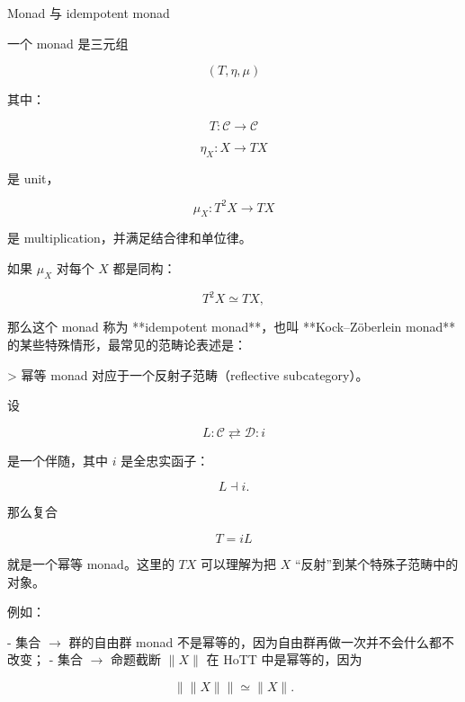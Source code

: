 \documentclass{beamer}
\begin{document}
\begin{frame}{Monad 与 idempotent monad}
\begin{markdown}
一个 monad 是三元组

$$
(T,\eta,\mu)
$$

其中：

$$
T:\mathcal C\to\mathcal C
$$

$$
\eta_X:X\to TX
$$

是 unit，

$$
\mu_X:T^2X\to TX
$$

是 multiplication，并满足结合律和单位律。

如果 $\mu_X$ 对每个 $X$ 都是同构：

$$
T^2X \simeq TX,
$$

那么这个 monad 称为 **idempotent monad**，也叫 **Kock–Zöberlein monad** 的某些特殊情形，最常见的范畴论表述是：

> 幂等 monad 对应于一个反射子范畴（reflective subcategory）。

设

$$
L:\mathcal C\rightleftarrows \mathcal D:i
$$

是一个伴随，其中 $i$ 是全忠实函子：

$$
L\dashv i.
$$

那么复合

$$
T=iL
$$

就是一个幂等 monad。这里的 $TX$ 可以理解为把 $X$ “反射”到某个特殊子范畴中的对象。

例如：

- 集合 $\to$ 群的自由群 monad 不是幂等的，因为自由群再做一次并不会什么都不改变；
- 集合 $\to$ 命题截断 $\|X\|$ 在 HoTT 中是幂等的，因为

  $$
  \|\|X\|\|\simeq \|X\|.
  $$
\end{markdown}
\end{frame}
\end{document}
